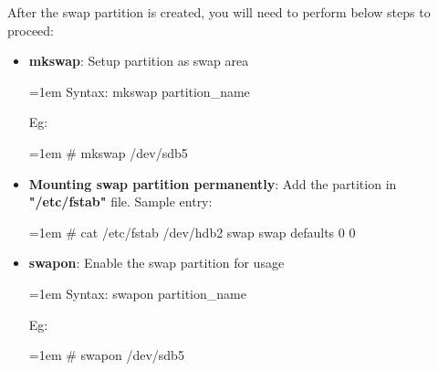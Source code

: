 \setlength{\columnsep}{3pt}
\begin{flushleft}
	
After the swap partition is created, you will need to perform below steps to proceed:
\begin{itemize}
	\item \textbf{mkswap}:  Setup partition as swap area
	\begin{tcolorbox}[breakable,notitle,boxrule=-0pt,colback=pink,colframe=pink]
		\color{black}
		\font=1em
		Syntax: mkswap partition\_name
		\font=4pt
	\end{tcolorbox}
	
	Eg:
	\begin{tcolorbox}[breakable,notitle,boxrule=-0pt,colback=black,colframe=black]
		\color{green}
		\font=1em
		\# mkswap /dev/sdb5
		\font=4pt
	\end{tcolorbox}

	\bigskip
	\bigskip
	
	\item \textbf{Mounting swap partition permanently}: Add the partition in \textbf{"/etc/fstab"} file.
	\newline
	Sample entry:
	\bigskip
	\begin{tcolorbox}[breakable,notitle,boxrule=-0pt,colback=black,colframe=black]
		\color{green}
		\font=1em
		\# cat /etc/fstab
		\newline
		\color{white}
		/dev/hdb2 swap swap defaults 0 0
		\font=4pt
	\end{tcolorbox}
		
	\bigskip
	\bigskip
		
	\item \textbf{swapon}:  Enable the swap partition for usage
	\begin{tcolorbox}[breakable,notitle,boxrule=-0pt,colback=pink,colframe=pink]
		\color{black}
		\font=1em
		Syntax: swapon partition\_name
		\font=4pt
	\end{tcolorbox}
	
	Eg:
	\begin{tcolorbox}[breakable,notitle,boxrule=-0pt,colback=black,colframe=black]
		\color{green}
		\font=1em
		\# swapon /dev/sdb5
		\font=4pt
	\end{tcolorbox}
	

\end{itemize}
\end{flushleft}
